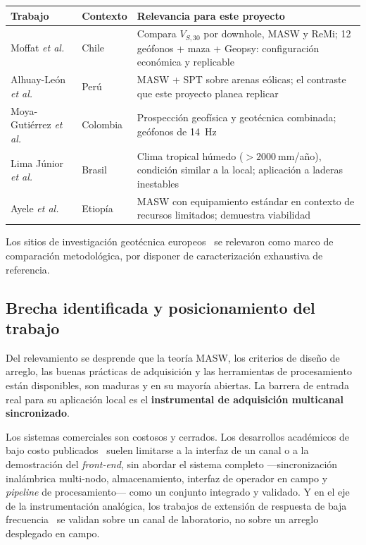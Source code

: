 \begin{center}\footnotesize
\begin{tabularx}{\textwidth}{@{}l l X@{}}
\toprule
Trabajo & Contexto & Relevancia para este proyecto \\
\midrule
Moffat \emph{et al.}~\cite{Moffat2016} & Chile & Compara $V_{S,30}$ por downhole, MASW y ReMi; 12 ge\'ofonos + maza + Geopsy: configuraci\'on econ\'omica y replicable \\
Alhuay-Le\'on \emph{et al.}~\cite{Alhuay2021} & Per\'u & MASW + SPT sobre arenas e\'olicas; el contraste que este proyecto planea replicar \\
Moya-Guti\'errez \emph{et al.}~\cite{Moya2020} & Colombia & Prospecci\'on geof\'isica y geot\'ecnica combinada; ge\'ofonos de \SI{14}{\hertz} \\
Lima J\'unior \emph{et al.}~\cite{LimaJunior2012} & Brasil & Clima tropical h\'umedo ($>\SI{2000}{\milli\meter}$/a\~no), condici\'on similar a la local; aplicaci\'on a laderas inestables \\
Ayele \emph{et al.}~\cite{Ayele2022} & Etiop\'ia & MASW con equipamiento est\'andar en contexto de recursos limitados; demuestra viabilidad \\
\bottomrule
\end{tabularx}
\end{center}

Los sitios de investigaci\'on geot\'ecnica europeos~\cite{Long2007,Blaker2019,Quinteros2019}
se relevaron como marco de comparaci\'on metodol\'ogica, por disponer de caracterizaci\'on
exhaustiva de referencia.

\subsection{Brecha identificada y posicionamiento del trabajo}

Del relevamiento se desprende que la teor\'ia MASW, los criterios de dise\~no de arreglo,
las buenas pr\'acticas de adquisici\'on y las herramientas de procesamiento est\'an
disponibles, son maduras y en su mayor\'ia abiertas. La barrera de entrada real para su
aplicaci\'on local es el \textbf{instrumental de adquisici\'on multicanal sincronizado}.

Los sistemas comerciales son costosos y cerrados. Los desarrollos acad\'emicos de bajo
costo publicados~\cite{Kafadar2020,Wijayaraja2024} suelen limitarse a la interfaz de un
canal o a la demostraci\'on del \emph{front-end}, sin abordar el sistema completo
---sincronizaci\'on inal\'ambrica multi-nodo, almacenamiento, interfaz de operador en campo
y \emph{pipeline} de procesamiento--- como un conjunto integrado y validado. Y en el eje
de la instrumentaci\'on anal\'ogica, los trabajos de extensi\'on de respuesta de baja
frecuencia~\cite{Ma2023,Deng2025} se validan sobre un canal de laboratorio, no sobre un
arreglo desplegado en campo.

